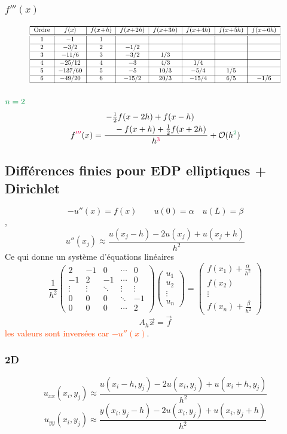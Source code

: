 \documentclass[resume]{subfiles}
\begin{document}
\subsubsection{$f'''(x)$}
\begin{figure}[H]
\centering
\includegraphics[width=\columnwidth,page=7]{diff_finies_tableaux.pdf}
\end{figure}
$\textcolor{ForestGreen}{n=2}$
$$f\textcolor{OrangeRed}{'''}(x)=\frac{\splitdfrac{-\frac{1}{2}f(x-2h)+f(x-h)}{-f(x+h)+\frac{1}{2}f(x+2h)}}{h^{\textcolor{OrangeRed}{3}}}+\mathcal{O}(h^{\textcolor{ForestGreen}{2}})$$
\subsection{Différences finies pour EDP elliptiques + Dirichlet}
$$-u''(x)=f(x)\qquad u(0)=\alpha\quad u(L)=\beta$$,
$$u''(x_j)\approx\frac{u(x_j-h)-2u(x_j)+u(x_j+h)}{h^2}$$
Ce qui donne un système d'équations linéaires
$$\frac{1}{h^2}\begin{pmatrix}
2 & -1 & 0 & \cdots & 0\\
-1 & 2 & -1 & \cdots & 0\\
\vdots & \vdots & \ddots & \vdots & \vdots\\
0 & 0 & 0 & \ddots & -1\\
0 & 0 & 0 & \cdots & 2
\end{pmatrix}\begin{pmatrix}u_1\\u_2\\\vdots\\u_n\end{pmatrix}=\begin{pmatrix}f(x_1)+\frac{\alpha}{h^2}\\f(x_2)\\\vdots\\f(x_n)+\frac{\beta}{h^2}\end{pmatrix}$$
$$A_h\vec{x}=\vec{f}$$
\textcolor{OrangeRed}{les valeurs sont inversées car $-u''(x)$}.
\subsubsection{2D}
$$u_{xx}(x_i,y_j)\approx\frac{u(x_i-h,y_j)-2u(x_i,y_j)+u(x_i+h,y_j)}{h^2}$$
$$u_{yy}(x_i,y_j)\approx\frac{y(x_i,y_j-h)-2u(x_i,y_j)+u(x_i,y_j+h)}{h^2}$$
\end{document}
